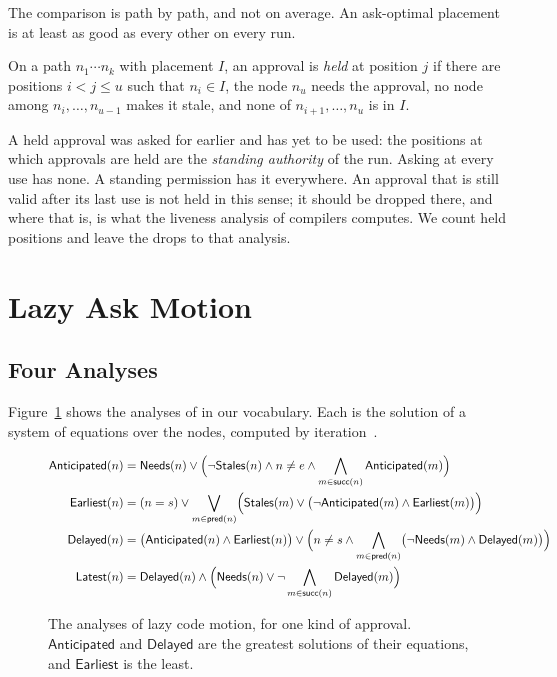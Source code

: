 \documentclass[acmsmall,nonacm,screen]{acmart}
\newcommand{\kw}[1]{\mathsf{#1}}
\newcommand{\Needs}{\kw{Needs}}
\newcommand{\Stales}{\kw{Stales}}
\newcommand{\Ant}{\kw{Anticipated}}
\newcommand{\Earliest}{\kw{Earliest}}
\newcommand{\Delayed}{\kw{Delayed}}
\newcommand{\Latest}{\kw{Latest}}
\newcommand{\pred}{\kw{pred}}
\newcommand{\successors}{\kw{succ}}
\begin{document}
The comparison is path by path, and not on average. An ask-optimal placement is at least
as good as every other on every run.

\begin{definition}[Held]
\label{def:held}
On a path $n_1 \cdots n_k$ with placement $I$, an approval is \emph{held} at position $j$ if
there are positions $i < j \le u$ such that $n_i \in I$, the node $n_u$ needs the approval,
no node among $n_i, \ldots, n_{u-1}$ makes it stale, and none of $n_{i+1}, \ldots, n_u$ is
in $I$.
\end{definition}

A held approval was asked for earlier and has yet to be used: the positions at which
approvals are held are the \emph{standing authority} of the run. Asking at every use has
none. A standing permission has it everywhere. An approval that is still valid after its
last use is not held in this sense; it should be dropped there, and where that is, is what
the liveness analysis of compilers computes. We count held positions and leave the drops to
that analysis.

\section{Lazy Ask Motion}
\label{sec:lazy}

\subsection{Four Analyses}

Figure~\ref{fig:equations} shows the analyses of \citet{knoop1994} in our vocabulary. Each is
the solution of a system of equations over the nodes, computed by
iteration~\cite{kildall1973}.

\begin{figure}
\small
\begin{align*}
\Ant(n) &= \Needs(n) \lor \Bigl(\lnot\Stales(n) \land n \neq e \land \bigwedge_{m \in \successors(n)} \Ant(m)\Bigr) \\
\Earliest(n) &= (n = s) \lor \bigvee_{m \in \pred(n)} \Bigl(\Stales(m) \lor \bigl(\lnot\Ant(m) \land \Earliest(m)\bigr)\Bigr) \\
\Delayed(n) &= \bigl(\Ant(n) \land \Earliest(n)\bigr) \lor \Bigl(n \neq s \land \bigwedge_{m \in \pred(n)} \bigl(\lnot\Needs(m) \land \Delayed(m)\bigr)\Bigr) \\
\Latest(n) &= \Delayed(n) \land \Bigl(\Needs(n) \lor \lnot \bigwedge_{m \in \successors(n)} \Delayed(m)\Bigr)
\end{align*}
\caption{The analyses of lazy code motion, for one kind of approval. $\Ant$ and $\Delayed$ are
the greatest solutions of their equations, and $\Earliest$ is the least.}
\label{fig:equations}
\end{figure}
\end{document}
